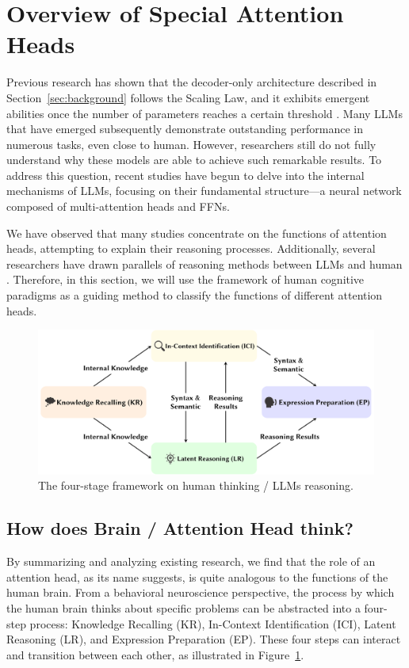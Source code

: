 \documentclass{article}
\begin{document}
\section{Overview of Special Attention Heads} \label{sec:HeadOverview}
Previous research has shown that the decoder-only architecture described in Section~\ref{sec:background} follows the Scaling Law, and it exhibits emergent abilities once the number of parameters reaches a certain threshold \citep{ScalingLaw_20_arXiv_OpenAI, ScalingLaw_21_arXiv_Stanford}. Many LLMs that have emerged subsequently demonstrate outstanding performance in numerous tasks, even close to human. However, researchers still do not fully understand why these models are able to achieve such remarkable results. To address this question, recent studies have begun to delve into the internal mechanisms of LLMs, focusing on their fundamental structure—a neural network composed of multi-attention heads and FFNs.

We have observed that many studies concentrate on the functions of attention heads, attempting to explain their reasoning processes. Additionally, several researchers have drawn parallels of reasoning methods  between LLMs and human \citep{ICSF_24_arXiv_IAAR, AIHumanGAP_24_Intelligence_UWA}. Therefore, in this section, we will use the framework of human cognitive paradigms as a guiding method to classify the functions of different attention heads.

\begin{figure}[htbp]
    \centering
    \includegraphics[width=0.8\linewidth]{figures/four_steps.pdf}
    \caption{The four-stage framework on human thinking / LLMs reasoning.}
    \label{fig:four_steps}
\end{figure}

\subsection{How does Brain / Attention Head think?}
By summarizing and analyzing existing research, we find that the role of an attention head, as its name suggests, is quite analogous to the functions of the human brain. From a behavioral neuroscience perspective, the process by which the human brain thinks about specific problems can be abstracted into a four-step process: Knowledge Recalling (KR), In-Context Identification (ICI), Latent Reasoning (LR), and Expression Preparation (EP). These four steps can interact and transition between each other, as illustrated in Figure~\ref{fig:four_steps}.
\end{document}
